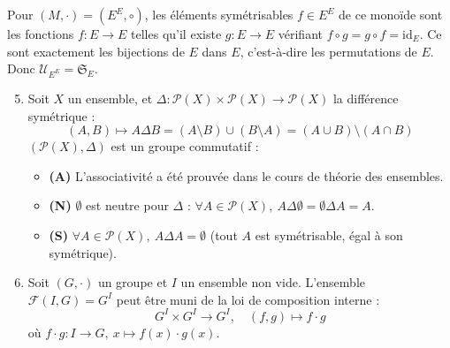 \documentclass[a4paper,11pt]{article}
\begin{document}
\begin{exemples}
Pour $(M, \cdot) = (E^E, \circ)$, les éléments symétrisables $f \in E^E$ de ce monoïde sont les fonctions $f : E \to E$ telles qu'il existe $g : E \to E$ vérifiant $f \circ g = g \circ f = \mathrm{id}_E$. Ce sont exactement les bijections de $E$ dans $E$, c'est-à-dire les permutations de $E$. Donc $\mathcal{U}_{E^E} = \mathfrak{S}_E$.

\begin{enumerate}
    \setcounter{enumi}{4}
    \item Soit $X$ un ensemble, et $\Delta : \mathcal{P}(X) \times \mathcal{P}(X) \to \mathcal{P}(X)$ la différence symétrique :
    \[
    (A, B) \longmapsto A \Delta B = (A \setminus B) \cup (B \setminus A) = (A \cup B) \setminus (A \cap B)
    \]
    $(\mathcal{P}(X), \Delta)$ est un groupe commutatif :
    \begin{itemize}
        \item \textbf{(A)} L'associativité a été prouvée dans le cours de théorie des ensembles.
        \item \textbf{(N)} $\emptyset$ est neutre pour $\Delta$ : $\forall A \in \mathcal{P}(X), \ A \Delta \emptyset = \emptyset \Delta A = A$.
        \item \textbf{(S)} $\forall A \in \mathcal{P}(X), \ A \Delta A = \emptyset$ (tout $A$ est symétrisable, égal à son symétrique).
    \end{itemize}
    
    \item Soit $(G, \cdot)$ un groupe et $I$ un ensemble non vide. L'ensemble $\mathcal{F}(I, G) = G^I$ peut être muni de la loi de composition interne :
    \[
    G^I \times G^I \longrightarrow G^I, \quad (f, g) \longmapsto f \cdot g
    \]
    où $f \cdot g : I \to G, \ x \mapsto f(x) \cdot g(x)$.
    

\end{enumerate}
\end{exemples}
\end{document}
